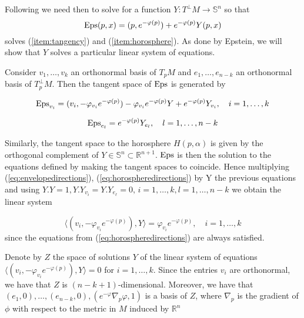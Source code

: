 \documentclass[12pt]{amsart}
\newcommand{\RR}{\mathbb{R}}
\newcommand{\Eps}{{\rm Eps}}
\begin{document}
Following \cite{Epstein84} we need then to solve for a function $Y:T^\perp M \rightarrow \mathbb{S}^n$ so that 
\begin{equation}\label{eq:Epsteinmap}
\Eps(p,x) = (p,e^{-\varphi(p)}) + e^{-\varphi(p)}Y(p,x)
\end{equation}
solves (\ref{item:tangency}) and (\ref{item:horosphere}). As done by Epstein, we will show that $Y$ solves a particular linear system of equations.

Consider $v_1, \ldots, v_k$ an orthonormal basis of $T_pM$ and $e_1, \ldots, e_{n-k}$ an orthonormal basis of $T^\perp_p M$. Then the tangent space of $\Eps$ is generated by

\begin{equation}\label{eq:envelopedirections}
\Eps_{v_i} = (v_i, -\varphi_{v_i}e^{-\varphi(p)}) - \varphi_{v_i}e^{-\varphi(p)}Y + e^{-\varphi(p)} Y_{v_i}, \quad i=1, \ldots, k
\end{equation}

\begin{equation}\label{eq:horospheredirections}
\Eps_{e_l} = e^{-\varphi(p)}Y_{e_l}, \quad l=1, \ldots, n-k
\end{equation}

Similarly, the tangent space to the horosphere $H(p,\alpha)$ is given by the orthogonal complement of $Y\in \mathbb{S}^n \subset \RR^{n+1}$. $\Eps$ is then the solution to the equations defined by making the tangent spaces to coincide. Hence multiplying (\ref{eq:envelopedirections}), (\ref{eq:horospheredirections}) by Y the previous equations and using $Y.Y=1, Y.Y_{v_i}= Y.Y_{e_\ell} = 0,\,i=1,\ldots,k, l=1, \ldots, n-k$ we obtain the linear system

\begin{equation}\label{eq:linearsystem}
\langle (v_i, -\varphi_{v_i}e^{-\varphi(p)}) , Y \rangle = \varphi_{v_i}e^{-\varphi(p)},\quad i=1,\ldots, k
\end{equation}
since the equations from (\ref{eq:horospheredirections}) are always satisfied.

Denote by $Z$ the space of solutions $Y$ of the linear system of equations $\langle (v_i, -\varphi_{v_i}e^{-\varphi(p)}) , Y \rangle =0$ for $i=1,\ldots, k$. Since the entries $v_i$ are orthonormal, we have that $Z$ is $(n-k+1)$-dimensional. Moreover, we have that $(e_1,0),\ldots, (e_{n-k},0), (e^{-\varphi}\nabla_p\varphi,1)$ is a basis of $Z$, where $\nabla_p$ is the gradient of $\phi$ with respect to the metric in $M$ induced by $\RR^n$
\end{document}
